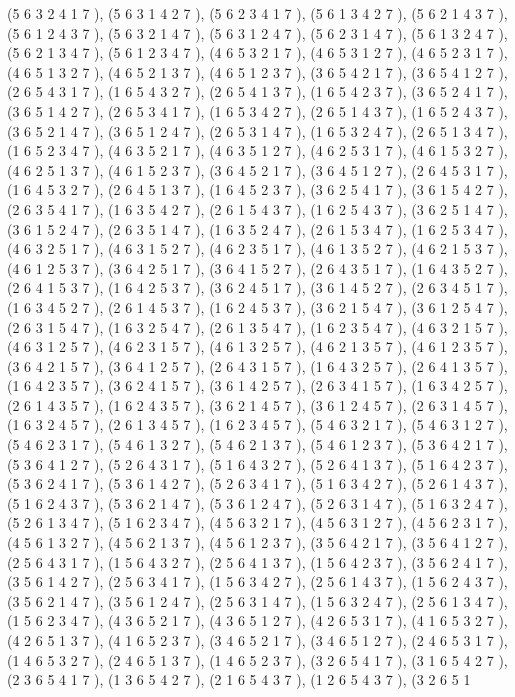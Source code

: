 \documentclass[12pt]{article}
\begin{document}
\begin{enumerate}
(5 6 3 2 4 1 7  ), (5 6 3 1 4 2 7  ), (5 6 2 3 4 1 7  ), (5 6 1 3 4 2 7  ), (5 6 2 1 4 3 7  ), (5 6 1 2 4 3 7  ), (5 6 3 2 1 4 7  ), (5 6 3 1 2 4 7  ), (5 6 2 3 1 4 7  ), (5 6 1 3 2 4 7  ), (5 6 2 1 3 4 7  ), (5 6 1 2 3 4 7  ), (4 6 5 3 2 1 7  ), (4 6 5 3 1 2 7  ), (4 6 5 2 3 1 7  ), (4 6 5 1 3 2 7  ), (4 6 5 2 1 3 7  ), (4 6 5 1 2 3 7  ), (3 6 5 4 2 1 7  ), (3 6 5 4 1 2 7  ), (2 6 5 4 3 1 7  ), (1 6 5 4 3 2 7  ), (2 6 5 4 1 3 7  ), (1 6 5 4 2 3 7  ), (3 6 5 2 4 1 7  ), (3 6 5 1 4 2 7  ), (2 6 5 3 4 1 7  ), (1 6 5 3 4 2 7  ), (2 6 5 1 4 3 7  ), (1 6 5 2 4 3 7  ), (3 6 5 2 1 4 7  ), (3 6 5 1 2 4 7  ), (2 6 5 3 1 4 7  ), (1 6 5 3 2 4 7  ), (2 6 5 1 3 4 7  ), (1 6 5 2 3 4 7  ), (4 6 3 5 2 1 7  ), (4 6 3 5 1 2 7  ), (4 6 2 5 3 1 7  ), (4 6 1 5 3 2 7  ), (4 6 2 5 1 3 7  ), (4 6 1 5 2 3 7  ), (3 6 4 5 2 1 7  ), (3 6 4 5 1 2 7  ), (2 6 4 5 3 1 7  ), (1 6 4 5 3 2 7  ), (2 6 4 5 1 3 7  ), (1 6 4 5 2 3 7  ), (3 6 2 5 4 1 7  ), (3 6 1 5 4 2 7  ), (2 6 3 5 4 1 7  ), (1 6 3 5 4 2 7  ), (2 6 1 5 4 3 7  ), (1 6 2 5 4 3 7  ), (3 6 2 5 1 4 7  ), (3 6 1 5 2 4 7  ), (2 6 3 5 1 4 7  ), (1 6 3 5 2 4 7  ), (2 6 1 5 3 4 7  ), (1 6 2 5 3 4 7  ), (4 6 3 2 5 1 7  ), (4 6 3 1 5 2 7  ), (4 6 2 3 5 1 7  ), (4 6 1 3 5 2 7  ), (4 6 2 1 5 3 7  ), (4 6 1 2 5 3 7  ), (3 6 4 2 5 1 7  ), (3 6 4 1 5 2 7  ), (2 6 4 3 5 1 7  ), (1 6 4 3 5 2 7  ), (2 6 4 1 5 3 7  ), (1 6 4 2 5 3 7  ), (3 6 2 4 5 1 7  ), (3 6 1 4 5 2 7  ), (2 6 3 4 5 1 7  ), (1 6 3 4 5 2 7  ), (2 6 1 4 5 3 7  ), (1 6 2 4 5 3 7  ), (3 6 2 1 5 4 7  ), (3 6 1 2 5 4 7  ), (2 6 3 1 5 4 7  ), (1 6 3 2 5 4 7  ), (2 6 1 3 5 4 7  ), (1 6 2 3 5 4 7  ), (4 6 3 2 1 5 7  ), (4 6 3 1 2 5 7  ), (4 6 2 3 1 5 7  ), (4 6 1 3 2 5 7  ), (4 6 2 1 3 5 7  ), (4 6 1 2 3 5 7  ), (3 6 4 2 1 5 7  ), (3 6 4 1 2 5 7  ), (2 6 4 3 1 5 7  ), (1 6 4 3 2 5 7  ), (2 6 4 1 3 5 7  ), (1 6 4 2 3 5 7  ), (3 6 2 4 1 5 7  ), (3 6 1 4 2 5 7  ), (2 6 3 4 1 5 7  ), (1 6 3 4 2 5 7  ), (2 6 1 4 3 5 7  ), (1 6 2 4 3 5 7  ), (3 6 2 1 4 5 7  ), (3 6 1 2 4 5 7  ), (2 6 3 1 4 5 7  ), (1 6 3 2 4 5 7  ), (2 6 1 3 4 5 7  ), (1 6 2 3 4 5 7  ), (5 4 6 3 2 1 7  ), (5 4 6 3 1 2 7  ), (5 4 6 2 3 1 7  ), (5 4 6 1 3 2 7  ), (5 4 6 2 1 3 7  ), (5 4 6 1 2 3 7  ), (5 3 6 4 2 1 7  ), (5 3 6 4 1 2 7  ), (5 2 6 4 3 1 7  ), (5 1 6 4 3 2 7  ), (5 2 6 4 1 3 7  ), (5 1 6 4 2 3 7  ), (5 3 6 2 4 1 7  ), (5 3 6 1 4 2 7  ), (5 2 6 3 4 1 7  ), (5 1 6 3 4 2 7  ), (5 2 6 1 4 3 7  ), (5 1 6 2 4 3 7  ), (5 3 6 2 1 4 7  ), (5 3 6 1 2 4 7  ), (5 2 6 3 1 4 7  ), (5 1 6 3 2 4 7  ), (5 2 6 1 3 4 7  ), (5 1 6 2 3 4 7  ), (4 5 6 3 2 1 7  ), (4 5 6 3 1 2 7  ), (4 5 6 2 3 1 7  ), (4 5 6 1 3 2 7  ), (4 5 6 2 1 3 7  ), (4 5 6 1 2 3 7  ), (3 5 6 4 2 1 7  ), (3 5 6 4 1 2 7  ), (2 5 6 4 3 1 7  ), (1 5 6 4 3 2 7  ), (2 5 6 4 1 3 7  ), (1 5 6 4 2 3 7  ), (3 5 6 2 4 1 7  ), (3 5 6 1 4 2 7  ), (2 5 6 3 4 1 7  ), (1 5 6 3 4 2 7  ), (2 5 6 1 4 3 7  ), (1 5 6 2 4 3 7  ), (3 5 6 2 1 4 7  ), (3 5 6 1 2 4 7  ), (2 5 6 3 1 4 7  ), (1 5 6 3 2 4 7  ), (2 5 6 1 3 4 7  ), (1 5 6 2 3 4 7  ), (4 3 6 5 2 1 7  ), (4 3 6 5 1 2 7  ), (4 2 6 5 3 1 7  ), (4 1 6 5 3 2 7  ), (4 2 6 5 1 3 7  ), (4 1 6 5 2 3 7  ), (3 4 6 5 2 1 7  ), (3 4 6 5 1 2 7  ), (2 4 6 5 3 1 7  ), (1 4 6 5 3 2 7  ), (2 4 6 5 1 3 7  ), (1 4 6 5 2 3 7  ), (3 2 6 5 4 1 7  ), (3 1 6 5 4 2 7  ), (2 3 6 5 4 1 7  ), (1 3 6 5 4 2 7  ), (2 1 6 5 4 3 7  ), (1 2 6 5 4 3 7  ), (3 2 6 5 1 
\end{enumerate}
\end{document}
